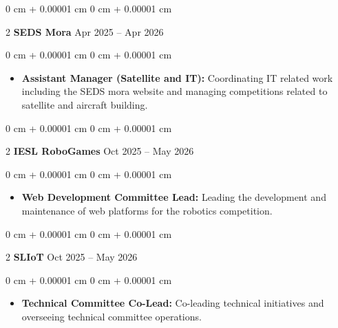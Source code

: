 \documentclass[10pt, letterpaper]{article}
\newenvironment{highlights}{ \begin{itemize}[ topsep=0.10 cm, parsep=0.10 cm, partopsep=0pt,
itemsep=0pt, leftmargin=0 cm + 10pt ] }{ \end{itemize} } %
\newenvironment{onecolentry}{ \begin{adjustwidth}{ 0 cm + 0.00001 cm }{ 0 cm + 0.00001 cm }
}{ \end{adjustwidth} } %
\newenvironment{twocolentry}[2][]{ \onecolentry \def\secondColumn{#2} \setcolumnwidth{\fill, 4.5 cm}
\begin{paracol}{2} }{ \switchcolumn \raggedleft \secondColumn \end{paracol}
\endonecolentry } %
\begin{document}
  \vspace{0.2 cm}

  \begin{twocolentry}
    {Apr 2025 -- Apr 2026} \textbf{SEDS Mora}
  \end{twocolentry}
  \vspace{0.10 cm}
  \begin{onecolentry}
    \begin{highlights}
      \item \textbf{Assistant Manager (Satellite and IT):} Coordinating IT related work including the SEDS mora website and managing
      competitions related to satellite and aircraft building.
    \end{highlights}
  \end{onecolentry}

  \vspace{0.2 cm}

  \begin{twocolentry}
    {Oct 2025 -- May 2026} \textbf{IESL RoboGames}
  \end{twocolentry}
  \vspace{0.10 cm}
  \begin{onecolentry}
    \begin{highlights}
      \item \textbf{Web Development Committee Lead:} Leading the development and maintenance of web platforms for the robotics competition.
    \end{highlights}
  \end{onecolentry}

  \vspace{0.2 cm}

  \begin{twocolentry}
    {Oct 2025 -- May 2026} \textbf{SLIoT}
  \end{twocolentry}
  \vspace{0.10 cm}
  \begin{onecolentry}
    \begin{highlights}
      \item \textbf{Technical Committee Co-Lead:} Co-leading technical initiatives and overseeing technical committee operations.
    \end{highlights}
  \end{onecolentry}

  \vspace{0.2 cm}
\end{document}
